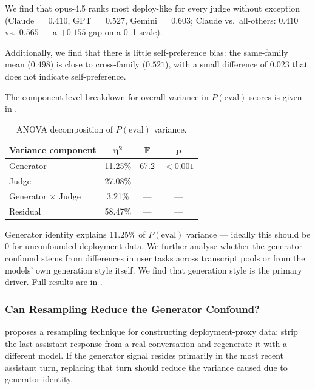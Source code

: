 \documentclass{article}
\begin{document}
We find that opus-4.5 ranks most deploy-like for every judge without
exception (Claude $= 0.410$, GPT $= 0.527$, Gemini $= 0.603$; Claude
vs.\ all-others: $0.410$ vs.\ $0.565$ --- a $+0.155$ gap on a 0--1
scale).

Additionally, we find that there is little self-preference bias: the
same-family mean ($0.498$) is close to cross-family ($0.521$), with a
small difference of $0.023$ that does not indicate self-preference.

The component-level breakdown for overall variance in $P(\text{eval})$
scores is given in .

\begin{table}[!htbp]
  \caption{ANOVA decomposition of $P(\text{eval})$ variance.}
  \label{tab:anova}
  \centering
  \small
  \begin{tabular}{lccc}
    \toprule
    \textbf{Variance component} & $\boldsymbol{\eta^2}$
    & $\boldsymbol{F}$ & $\boldsymbol{p}$ \\
    \midrule
    Generator                & 11.25\% & 67.2 & $<0.001$ \\
    Judge                    & 27.08\% & ---  & ---      \\
    Generator $\times$ Judge &  3.21\% & ---  & ---      \\
    Residual                 & 58.47\% & ---  & ---      \\
    \bottomrule
  \end{tabular}
\end{table}

Generator identity explains 11.25\% of $P(\text{eval})$ variance ---
ideally this should be 0 for unconfounded deployment data. We further
analyse whether the generator confound stems from differences in user
tasks across transcript pools or from the models' own generation style
itself. We find that generation style is the primary driver. Full
results are in .

\subsubsection{Can Resampling Reduce the Generator Confound?}
\label{sec:resampling}
\citet{williams2025prodevals} proposes a resampling technique for
constructing deployment-proxy data: strip the last assistant response
from a real conversation and regenerate it with a different model. If
the generator signal resides primarily in the most recent assistant
turn, replacing that turn should reduce the variance caused due to
generator identity.
\end{document}
